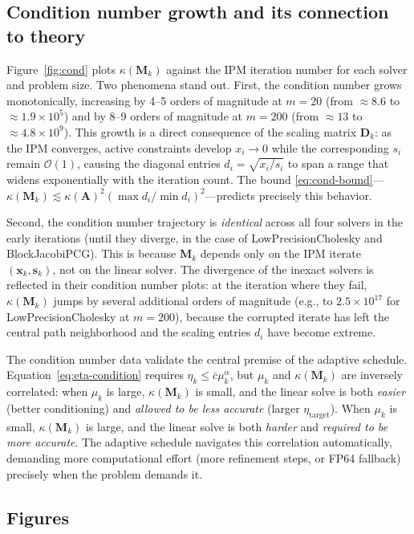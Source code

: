 \documentclass[11pt,twoside]{article}
\newcommand{\bA}{\mathbf{A}}
\newcommand{\bx}{\mathbf{x}}
\newcommand{\bs}{\mathbf{s}}
\newcommand{\bD}{\mathbf{D}}
\newcommand{\bM}{\mathbf{M}}
\newcommand{\cO}{\mathcal{O}}
\begin{document}
\subsection{Condition number growth and its connection to theory}

Figure~\ref{fig:cond} plots $\kappa(\bM_k)$ against the IPM iteration
number for each solver and problem size.  Two phenomena stand out.
First, the condition number grows monotonically, increasing by 4--5
orders of magnitude at $m=20$ (from $\approx 8.6$ to $\approx 1.9\times
10^5$) and by 8--9 orders of magnitude at $m=200$ (from $\approx 13$ to
$\approx 4.8\times 10^9$).  This growth is a direct consequence of the
scaling matrix $\bD_k$: as the IPM converges, active constraints develop
$x_i \to 0$ while the corresponding $s_i$ remain $\cO(1)$, causing the
diagonal entries $d_i = \sqrt{x_i/s_i}$ to span a range that widens
exponentially with the iteration count.  The bound
\eqref{eq:cond-bound}---$\kappa(\bM_k) \lesssim \kappa(\bA)^2 (\max
d_i / \min d_i)^2$---predicts precisely this behavior.

Second, the condition number trajectory is \emph{identical} across all
four solvers in the early iterations (until they diverge, in the case of
LowPrecisionCholesky and BlockJacobiPCG).  This is because $\bM_k$
depends only on the IPM iterate $(\bx_k,\bs_k)$, not on the linear
solver.  The divergence of the inexact solvers is reflected in their
condition number plots: at the iteration where they fail, $\kappa(\bM_k)$
jumps by several additional orders of magnitude (e.g., to $2.5\times
10^{17}$ for LowPrecisionCholesky at $m=200$), because the corrupted
iterate has left the central path neighborhood and the scaling entries
$d_i$ have become extreme.

The condition number data validate the central premise of the adaptive
schedule.  Equation~\eqref{eq:eta-condition} requires $\eta_k \le
\bar{c}\mu_k^\alpha$, but $\mu_k$ and $\kappa(\bM_k)$ are inversely
correlated: when $\mu_k$ is large, $\kappa(\bM_k)$ is small, and the
linear solve is both \emph{easier} (better conditioning) and
\emph{allowed to be less accurate} (larger $\eta_{\text{target}}$).
When $\mu_k$ is small, $\kappa(\bM_k)$ is large, and the linear solve is
both \emph{harder} and \emph{required to be more accurate}.  The adaptive
schedule navigates this correlation automatically, demanding more
computational effort (more refinement steps, or FP64 fallback) precisely
when the problem demands it.

\subsection{Figures}
\end{document}
